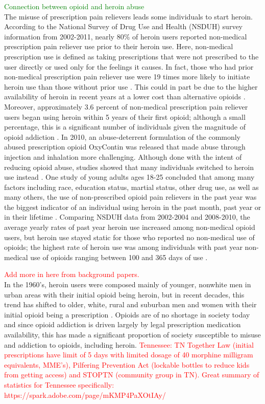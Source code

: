 \documentclass[12pt]{article}
\begin{document}
\textcolor{green}{Connection between opioid and heroin abuse} \\
The misuse of prescription pain relievers leads some individuals to start heroin. %
According to the National Survey of Drug Use and Health (NSDUH) survey information from 2002-2011, nearly 80\% of heroin users reported non-medical prescription pain reliever use prior to their heroin use. Here, non-medical prescription use is defined as taking prescriptions that were not prescribed to the user directly or used only for the feelings it causes. In fact, those who had prior non-medical prescription pain reliever use were 19 times more likely to initiate heroin use than those without prior use \cite{Muhuri}. This could in part be due to the higher availability of heroin in recent years at a lower cost than alternative opioids \cite{NIDA1}. Moreover, approximately 3.6 percent of non-medical prescription pain reliever users began using heroin within 5 years of their first opioid; although a small percentage, this is a significant number of individuals given the magnitude of opioid addiction \cite{Muhuri}. In 2010, an abuse-deterrent formulation of the commonly abused prescription opioid OxyContin was released that made abuse through injection and inhalation more challenging. Although done with the intent of reducing opioid abuse, studies showed that many individuals switched to heroin use instead \cite{Cicero2, Cicero3}. One study of young adults ages 18-25 concluded that among many factors including race, education status, martial status, other drug use, as well as many others, the use of non-prescribed opioid pain relievers in the past year was the biggest indicator of an individual using heroin in the past month, past year or in their lifetime \cite{Ihongbe}. Comparing NSDUH data from 2002-2004 and 2008-2010, the average yearly rates of past year heroin use increased among non-medical opioid users, but heroin use stayed static for those who reported no non-medical use of opioids; the highest rate of heroin use was among individuals with past year non-medical use of opioids ranging between 100 and 365 days of use \cite{Jones}. 

\textcolor{red}{Add more in here from background papers.}\\ In the 1960's, heroin users were composed mainly of younger, nonwhite men in urban areas with their initial opioid being heroin, but in recent decades, this trend has shifted to older, white, rural and suburban men and women with their initial opioid being a prescription \cite{Cicero}. Opioids are of no shortage in society today and since opioid addiction is driven largely by legal prescription medication availability, this has made a significant proportion of society susceptible to misuse and addiction to opioids, including heroin. 
\textcolor{red}{Tennessee: TN Together Law (initial prescriptions have limit of 5 days with limited dosage of 40 morphine milligram equivalents, MME's), Pilfering Prevention Act (lockable bottles to reduce kids from getting access) and STOPTN (community group in TN). Great summary of statistics for Tennessee specifically: https://spark.adobe.com/page/mKMP4PaXOtIAy/}
\end{document}
